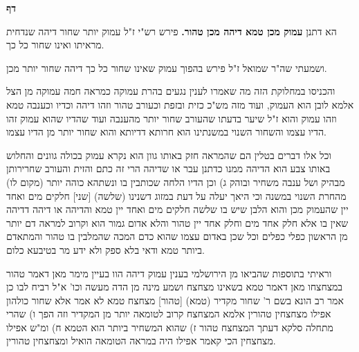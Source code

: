 \documentclass[12pt, openany]{book}
\newcommand{\sethebfont}{
\fontsize{10.5pt}{21.0pt} \selectfont
}
\newcommand{\twocol}[1]{
	{\sethebfont \begin{multicols}{2}
			#1
	\end{multicols}}	
}
\newcommand{\chapname}{}
\newcommand{\newchap}[1]{
	\addcontentsline{toc}{chapter}{#1}
	\renewcommand{\chapname}{#1}
		\begin{center}
			\textbf{%
\fontsize{16pt}{16pt}\selectfont
				#1}
		\end{center}
}
\begin{document}
\newchap{דף }
\twocol{הא דתנן \textbf{עמוק מכן טמא דיהה מכן טהור.}  פירש רש"י ז"ל עמוק יותר שחור דיהה שנדחית מראיתו ואינו שחור כל כך.\par ושמעתי שה"ר שמואל ז"ל פירש בהפוך עמוק שאינו שחור כל כך דיהה שחור יותר מכן.\par  והכניסו במחלוקת הזה מה שאמרו לענין נגעים בהרת עמוקה כמראה חמה עמוקה מן הצל אלמא לובן הוא העמוק, ועוד מזה מש"כ כזית ובזפת וכעורב טהור וזהו דיהה וכדיו וכענבה טמא וזהו עמוק והוא ז"ל שיער בדעתו שהעורב שחור יותר מהענבה ועוד שהדיו שהוא עמוק זהו הדיו עצמו והשחור השנוי במשנתינו הוא חרותא דדיותא והוא שחור יותר מן הדיו עצמו.\par  וכל אלו דברים בטלין הם שהמראה חזק באותו גוון הוא נקרא עמוק בכולה גוונים והחלוש באותו צבע הוא הדיהה ממנו כדתנן עבר או שדיהה הרי זה כתם והזית והעורב שחרירותן מבהיק ושל ענבה משחיר ובוהק ג) וכן הדיו הלחה שכותבין בו ונשתהא כוהה יותר (מקום לו) מהחרת השנוי במשנה וכי היאך יעלה על דעת במזוג דשנינו (שלשה) [שני] חלקים מים ואחד יין שהעמוק מכן והוא הלבן שיש בו שלשה חלקים מים ואחד יין טמא והדיהה או דיהה דדיהה שאין בו אלא חלק אחד מים וחלק אחד יין טהור והלא אדום גמור הוא וקרוב למראה דם יותר מן הראשון כפלי כפלים וכל שכן באדום עצמו שהוא כדם המכה שהמלבין בו טהור והמתאדם ביותר טמא ודאי בלא ספק ולא ידע מר בטיבעא כלום.\par  וראיתי בתוספות שהביאו מן הירושלמי בענין עמוק דיהה הוו בעיין מימר מאן דאמר טהור במצחצחו מאן דאמר טמא בשאינו מצחצח ושמע מינה מן הדה מעשה וכו' א"ל רביח לבו כן אמר רב הונא בשם ר' שחור מקדיר (טמא) [טהור] מצחצח טמא לא אמר אלא שחור כולהון אפילו מצחצחין טהורין אלמא המצחצח קרוב לטומאה יותר מן המקדיר וזה הפך ו) שהרי מתחלה סלקא דעתך המצחצח טהור ז) שהוא המשחיר ביותר הוא הטמא ח) ומ"ש אפילו מצחצחין הכי קאמר אפילו היה במראה הטומאה הואיל ומצחצחין טהורין. 
\par}
\end{document}
